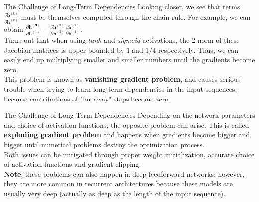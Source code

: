 \documentclass[aspectratio=169]{beamer}
\begin{document}

\begin{frame}{The Challenge of Long-Term Dependencies}
Looking closer, we see that terms $\frac{\partial \bm{h^{(t)}}}{\partial \bm{h}^{(k)}}$ must be themselves computed through the chain rule. For example, we can obtain $\frac{\partial \bm{h^{(3)}}}{\partial \bm{h}^{(1)}} = \frac{\partial \bm{h^{(3)}}}{\partial \bm{h}^{(2)}} \frac{\partial \bm{h^{(2)}}}{\partial \bm{h}^{(1)}}$.\\
\vspace{0.5cm}
Turns out \cite{pascanu2013difficulty} that when using \textit{tanh} and \textit{sigmoid} activations, the 2-norm of these Jacobian matrices is upper bounded by $1$ and $1/4$ respectively. Thus, we can easily end up multiplying smaller and smaller numbers until the gradients become zero.\\
\vspace{0.5cm}
This problem is known as \textbf{vanishing gradient problem}, and causes serious trouble when trying to learn long-term dependencies in the input sequences, because contributions of "far-away" steps become zero.
\end{frame}


\begin{frame}{The Challenge of Long-Term Dependencies}
Depending on the network parameters and choice of activation functions, the opposite problem can arise. This is called \textbf{exploding gradient problem} and happens when gradients become bigger and bigger until numerical problems destroy the optimization process.\\
\vspace{0.5cm}
Both issues can be mitigated through proper weight initialization, accurate choice of activation functions and gradient clipping.\\
\vspace{0.5cm}
\textbf{Note}: these problems can also happen in deep feedforward networks: however, they are more common in recurrent architectures because these models are usually very deep (actually as deep as the length of the input sequence).
\end{frame}

\end{document}
